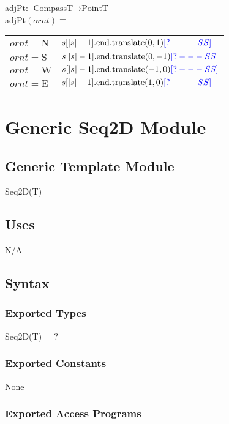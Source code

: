 \documentclass[12pt]{article}
\newcommand{\authornote}[3]{\textcolor{#1}{[#3 ---#2]}}
\newcommand{\authornote}[3]{}
\newcommand{\wss}[1]{\authornote{blue}{SS}{#1}}
\begin{document}
\noindent adjPt: $\mbox{CompassT} \rightarrow \mbox{PointT}$\\
adjPt$(ornt) \equiv$

\medskip

\begin{tabular}{|l|l|}
\hline
$ornt = \mbox{N}$ & $s[|s|-1].\mbox{end}.\mbox{translate}(0,1)\wss{?}$\\
\hline
$ornt = \mbox{S}$ & $s[|s|-1].\mbox{end}.\mbox{translate}(0,-1)\wss{?}$\\
\hline
$ornt = \mbox{W}$ & $s[|s|-1].\mbox{end}.\mbox{translate}(-1,0)\wss{?}$\\
\hline
$ornt = \mbox{E}$ & $s[|s|-1].\mbox{end}.\mbox{translate}(1,0)\wss{?}$\\
\hline
\end{tabular}

\newpage

\section* {Generic Seq2D Module}

\subsection* {Generic Template Module}

Seq2D(T)

\subsection* {Uses}

N/A

\subsection* {Syntax}

\subsubsection* {Exported Types}

Seq2D(T) = ?

\subsubsection* {Exported Constants}

None

\subsubsection* {Exported Access Programs}
\end{document}
